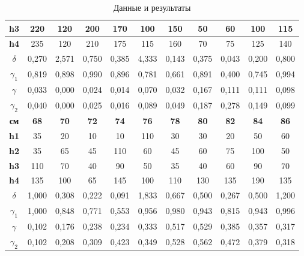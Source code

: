 \documentclass[a4paper, 12pt]{article}
\begin{document}
\begin{table}[H]
\begin{tabular}{|c|c|c|c|c|c|c|c|c|c|c|}
	\textbf{h3}         & 220         & 120         & 200         & 170         & 100         & 150         & 50          & 60          & 100         & 115         \\ \hline
	\textbf{h4}         & 235         & 120         & 210         & 175         & 115         & 160         & 70          & 75          & 125         & 140         \\ \hline
	\textbf{$\delta$}   & 0,270       & 2,571       & 0,750       & 0,385       & 4,333       & 0,143       & 0,375       & 0,043       & 0,200       & 0,800       \\ \hline
	\textbf{$\gamma_1$} & 0,819       & 0,898       & 0,990       & 0,896       & 0,781       & 0,661       & 0,891       & 0,400       & 0,745       & 0,994       \\ \hline
	\textbf{$\gamma$}   & 0,033       & 0,000       & 0,024       & 0,014       & 0,070       & 0,032       & 0,167       & 0,111       & 0,111       & 0,098       \\ \hline
	\textbf{$\gamma_2$} & 0,040       & 0,000       & 0,025       & 0,016       & 0,089       & 0,049       & 0,187       & 0,278       & 0,149       & 0,099       \\ \hline
	\textbf{см}         & \textbf{68} & \textbf{70} & \textbf{72} & \textbf{74} & \textbf{76} & \textbf{78} & \textbf{80} & \textbf{82} & \textbf{84} & \textbf{86} \\ \hline
	\textbf{h1}         & 35          & 20          & 10          & 10          & 110         & 30          & 30          & 20          & 50          & 60          \\ \hline
	\textbf{h2}         & 35          & 65          & 45          & 110         & 60          & 45          & 60          & 75          & 100         & 50          \\ \hline
	\textbf{h3}         & 110         & 70          & 40          & 90          & 50          & 35          & 40          & 60          & 90          & 70          \\ \hline
	\textbf{h4}         & 135         & 100         & 65          & 145         & 100         & 110         & 130         & 135         & 190         & 135         \\ \hline
	\textbf{$\delta$}   & 1,000       & 0,308       & 0,222       & 0,091       & 1,833       & 0,667       & 0,500       & 0,267       & 0,500       & 1,200       \\ \hline
	\textbf{$\gamma_1$} & 1,000       & 0,848       & 0,771       & 0,553       & 0,956       & 0,980       & 0,943       & 0,815       & 0,943       & 0,996       \\ \hline
	\textbf{$\gamma$}   & 0,102       & 0,176       & 0,238       & 0,234       & 0,333       & 0,517       & 0,529       & 0,385       & 0,357       & 0,317       \\ \hline
	\textbf{$\gamma_2$} & 0,102       & 0,208       & 0,309       & 0,423       & 0,349       & 0,528       & 0,562       & 0,472       & 0,379       & 0,318       \\ \hline
	\end{tabular}
	\caption{Данные и результаты}
	\label{tab:data2}
\end{table}
\end{document}
